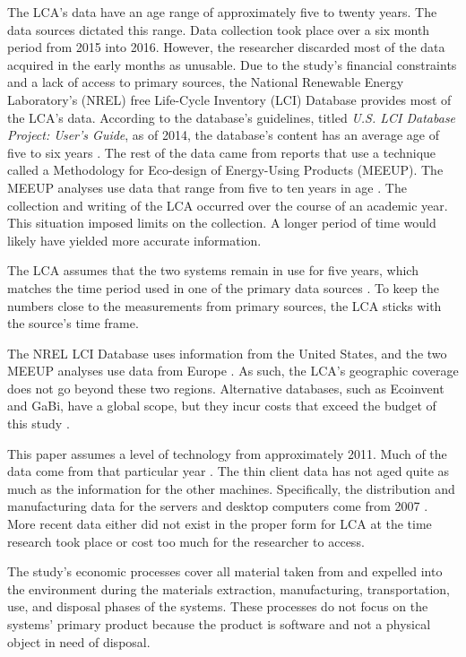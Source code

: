 \documentclass[final,journal,10pt,letterpaper,oneside,twocolumn,compsoc]%
{IEEEtran}
\begin{document}
The LCA's data have an age range of approximately five to twenty years. The
data sources dictated this range. Data
collection took place over a six month period from 2015 into 2016. However, the
researcher discarded
most of the data acquired in the early months as unusable. Due to the study's
financial constraints and a
lack of access to primary sources, the National Renewable Energy Laboratory's
(NREL) free Life-Cycle Inventory (LCI) Database provides most of the LCA's
data. According to the database's guidelines, titled \textit{U.S. LCI Database
Project: User's Guide}, as of 2014, the database's content has an average age
of five to six years
\cite{database}. The rest of the data came from reports that use a technique
called a Methodology for Eco-design of Energy-Using Products (MEEUP). The MEEUP
analyses use data that
range from five to ten years in age \cite{client} \cite{desktop}. The collection
and writing
of the LCA occurred over the course of an academic year. This situation
imposed limits on the collection. A longer period of time would likely have
yielded more accurate information.

The LCA assumes that the two systems remain in use for five years, which
matches the time period used in one of the primary data sources \cite{client}.
To keep the numbers close to the measurements from primary sources, the LCA
sticks with the source's time frame.

The NREL LCI Database uses information from the United States, and
the two MEEUP analyses use data from Europe \cite{database} \cite{client}
\cite{desktop}. As
such, the LCA's geographic coverage does not go beyond these two regions.
Alternative databases, such as Ecoinvent and GaBi, have a global scope, but they
incur costs that exceed the budget of this study \cite{textbook}.

This paper assumes a level of technology from approximately 2011. Much of the
data come
from that particular year \cite{client}. The thin client data has not aged quite
as much as
the information for the other machines. Specifically, the distribution and
manufacturing data for the
servers and desktop computers come from 2007 \cite{desktop}. More recent data
either did not exist in the proper form for LCA at the time research took place
or cost too much for the researcher to access.

The study's economic processes cover all material taken from and expelled into
the environment during the materials extraction, manufacturing, transportation,
use, and disposal phases of the systems. These
processes do not focus on the systems' primary product because the product is
software and not a physical object in need of disposal.
\end{document}
